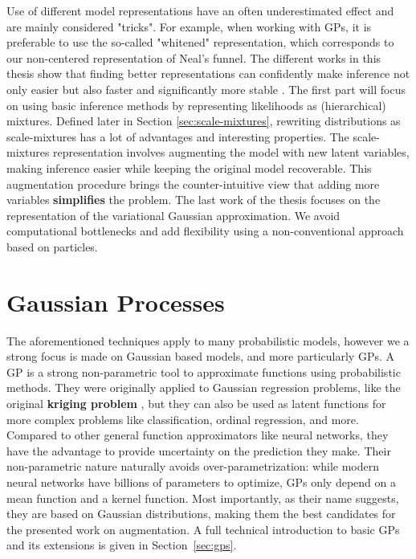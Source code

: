 Use of different model representations have an often underestimated effect and are mainly considered "tricks".
For example, when working with \acf{GPs}, it is preferable to use the so-called "whitened" representation, which corresponds to our non-centered representation of Neal's funnel.
The different works in this thesis show that finding better representations can confidently make inference not only easier but also faster and significantly more stable . 
The first part will focus on using basic inference methods by representing likelihoods as (hierarchical) mixtures.
Defined later in Section \ref{sec:scale-mixtures}, rewriting distributions as scale-mixtures has a lot of advantages and interesting properties.
The scale-mixtures representation involves augmenting the model with new latent variables, making inference easier while keeping the original model recoverable.
This augmentation procedure brings the counter-intuitive view that adding more variables \textbf{simplifies} the problem.
The last work of the thesis focuses on the representation of the variational Gaussian approximation.
We avoid computational bottlenecks and add flexibility using a non-conventional approach based on particles.

\section{Gaussian Processes}

The aforementioned techniques apply to many probabilistic models, however we a strong focus is made on Gaussian based models, and more particularly \acf{GPs}.
A \ac{GP} is a strong non-parametric tool to approximate functions using probabilistic methods.
They were originally applied to Gaussian regression problems, like the original \textbf{kriging problem} \cite{cressie1990origins}, but they can also be used as latent functions for more complex problems like classification, ordinal regression, and more.
Compared to other general function approximators like neural networks, they have the advantage to provide uncertainty on the prediction they make.
Their non-parametric nature naturally avoids over-parametrization: while modern neural networks have billions of parameters to optimize, \ac{GPs} only depend on a mean function and a kernel function.
Most importantly, as their name suggests, they are based on Gaussian distributions, making them the best candidates for the presented work on augmentation.
A full technical introduction to basic \ac{GPs} and its extensions is given in Section~\ref{sec:gps}.

